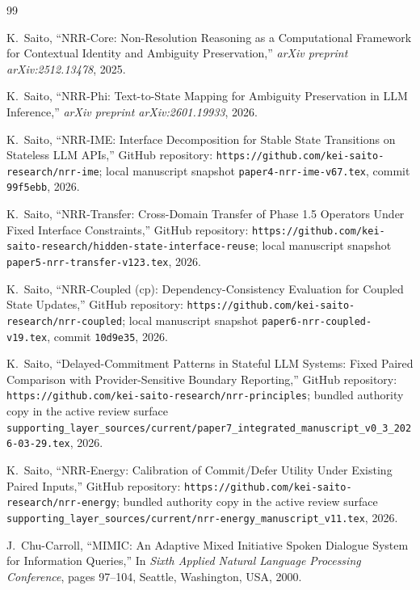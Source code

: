 \documentclass[11pt]{article}
\begin{document}
\begin{thebibliography}{99}
\raggedright

K.~Saito,
\newblock ``NRR-Core: Non-Resolution Reasoning as a Computational Framework for Contextual Identity and Ambiguity Preservation,''
\newblock \emph{arXiv preprint arXiv:2512.13478}, 2025.

K.~Saito,
\newblock ``NRR-Phi: Text-to-State Mapping for Ambiguity Preservation in LLM Inference,''
\newblock \emph{arXiv preprint arXiv:2601.19933}, 2026.

K.~Saito,
\newblock ``NRR-IME: Interface Decomposition for Stable State Transitions on Stateless LLM APIs,''
\newblock GitHub repository: \texttt{https://github.com/kei-saito-research/nrr-ime}; local manuscript snapshot \texttt{paper4-nrr-ime-v67.tex}, commit \texttt{99f5ebb}, 2026.

K.~Saito,
\newblock ``NRR-Transfer: Cross-Domain Transfer of Phase 1.5 Operators Under Fixed Interface Constraints,''
\newblock GitHub repository: \texttt{https://github.com/kei-saito-research/hidden-state-interface-reuse}; local manuscript snapshot \texttt{paper5-nrr-transfer-v123.tex}, 2026.

K.~Saito,
\newblock ``NRR-Coupled (cp): Dependency-Consistency Evaluation for Coupled State Updates,''
\newblock GitHub repository: \texttt{https://github.com/kei-saito-research/nrr-coupled}; local manuscript snapshot \texttt{paper6-nrr-coupled-v19.tex}, commit \texttt{10d9e35}, 2026.

K.~Saito,
\newblock ``Delayed-Commitment Patterns in Stateful LLM Systems: Fixed Paired Comparison with Provider-Sensitive Boundary Reporting,''
\newblock GitHub repository: \texttt{https://github.com/kei-saito-research/nrr-principles}; bundled authority copy in the active review surface \texttt{supporting\_layer\_sources/current/paper7\_integrated\_manuscript\_v0\_3\_2026-03-29.tex}, 2026.

K.~Saito,
\newblock ``NRR-Energy: Calibration of Commit/Defer Utility Under Existing Paired Inputs,''
\newblock GitHub repository: \texttt{https://github.com/kei-saito-research/nrr-energy}; bundled authority copy in the active review surface \texttt{supporting\_layer\_sources/current/nrr-energy\_manuscript\_v11.tex}, 2026.

J.~Chu-Carroll,
\newblock ``MIMIC: An Adaptive Mixed Initiative Spoken Dialogue System for Information Queries,''
\newblock In \emph{Sixth Applied Natural Language Processing Conference}, pages 97--104, Seattle, Washington, USA, 2000.


\end{thebibliography}
\end{document}
